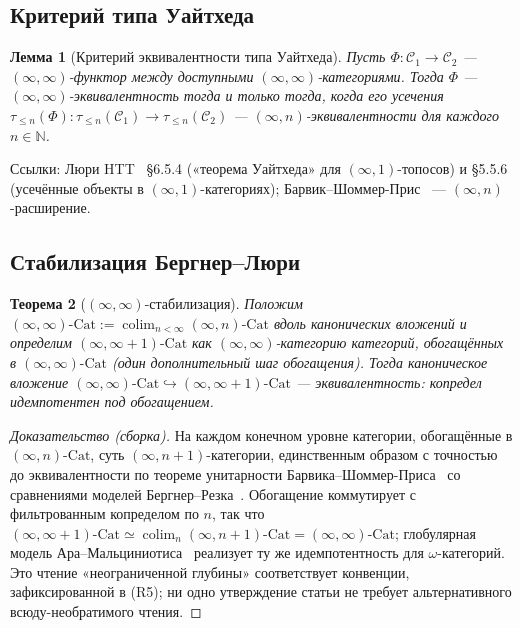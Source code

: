 \documentclass[11pt]{article}
\theoremstyle{plain}
\newtheorem{theorem}{Теорема}[section]
\newtheorem{lemma}[theorem]{Лемма}
\theoremstyle{definition}
\newcommand{\cC}{\mathcal{C}}
\newcommand{\Cat}{\mathrm{Cat}}
\DeclareMathOperator{\colim}{colim}
\begin{document}
\subsection{Критерий типа Уайтхеда}

\begin{lemma}[Критерий эквивалентности типа Уайтхеда]\label{lem:whitehead}
Пусть $\Phi : \cC_1 \to \cC_2$ — $(\infty, \infty)$-функтор между доступными $(\infty, \infty)$-категориями. Тогда $\Phi$ — $(\infty, \infty)$-эквивалентность тогда и только тогда, когда его усечения $\tau_{\leq n}(\Phi) : \tau_{\leq n}(\cC_1) \to \tau_{\leq n}(\cC_2)$ — $(\infty, n)$-эквивалентности для каждого $n \in \mathbb{N}$.
\end{lemma}

Ссылки: Люри HTT~\cite{LurieHTT} \S 6.5.4 («теорема Уайтхеда» для $(\infty, 1)$-топосов) и \S 5.5.6 (усечённые объекты в $(\infty, 1)$-категориях); Барвик--Шоммер-Прис~\cite{BarwickSchommerPries2021} — $(\infty, n)$-расширение.

\subsection{Стабилизация Бергнер--Люри}

\begin{theorem}[$(\infty, \infty)$-стабилизация]\label{thm:bergner-lurie-stab}
Положим $(\infty, \infty)\text{-}\Cat := \colim_{n < \infty} (\infty, n)\text{-}\Cat$ вдоль канонических вложений и определим $(\infty, \infty + 1)\text{-}\Cat$ как $(\infty, \infty)$-категорию категорий, обогащённых в $(\infty, \infty)\text{-}\Cat$ (один дополнительный шаг обогащения). Тогда каноническое вложение $(\infty, \infty)\text{-}\Cat \hookrightarrow (\infty, \infty + 1)\text{-}\Cat$ — эквивалентность: копредел идемпотентен под обогащением.
\end{theorem}

\begin{proof}[Доказательство (сборка)]
На каждом конечном уровне категории, обогащённые в $(\infty, n)\text{-}\Cat$, суть $(\infty, n+1)$-категории, единственным образом с точностью до эквивалентности по теореме унитарности Барвика--Шоммер-Приса~\cite{BarwickSchommerPries2021} со сравнениями моделей Бергнер--Резка~\cite{BergnerRezk2013}. Обогащение коммутирует с фильтрованным копределом по $n$, так что $(\infty, \infty+1)\text{-}\Cat \simeq \colim_n (\infty, n+1)\text{-}\Cat = (\infty, \infty)\text{-}\Cat$; глобулярная модель Ара--Мальциниотиса~\cite{AraMaltsiniotis2017} реализует ту же идемпотентность для $\omega$-категорий. Это чтение «неограниченной глубины» соответствует конвенции, зафиксированной в (R5); ни одно утверждение статьи не требует альтернативного всюду-необратимого чтения.
\end{proof}
\end{document}
